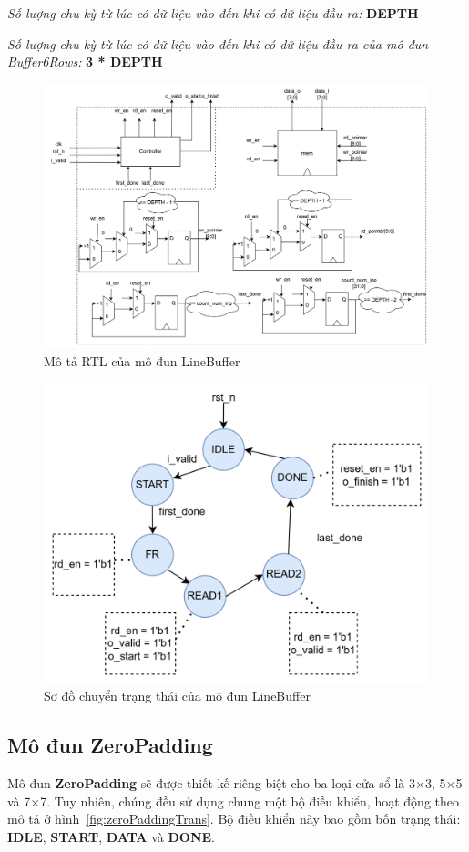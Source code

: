 \textit{Số lượng chu kỳ từ lúc có dữ liệu vào đến khi có dữ liệu đầu ra: } \textbf{DEPTH}


\textit{Số lượng chu kỳ từ lúc có dữ liệu vào đến khi có dữ liệu đầu ra của mô đun Buffer6Rows: } \textbf{3 * DEPTH}


\begin{figure}[!ht]
    \centering
    \includegraphics[width=\linewidth]{figures/lineBuffArchitecture.png}
    \caption{Mô tả RTL của mô đun LineBuffer}
    \label{fig:lineBuffArchitecture}
\end{figure}


\begin{figure}[!ht]
    \centering
    \includegraphics[width=0.8\linewidth]{figures/lineBufferTrans.png}
    \caption{Sơ đồ chuyển trạng thái của mô đun LineBuffer}
    \label{fig:lineBufferTrans}
\end{figure}


\subsection{Mô đun ZeroPadding}
Mô-đun \textbf{ZeroPadding} sẽ được thiết kế riêng biệt cho ba loại cửa sổ là 3$\times$3, 5$\times$5 và 7$\times$7. Tuy nhiên, chúng đều sử dụng chung một bộ điều khiển, hoạt động theo mô tả ở hình~\ref{fig:zeroPaddingTrans}. Bộ điều khiển này bao gồm bốn trạng thái: \textbf{IDLE}, \textbf{START}, \textbf{DATA} và \textbf{DONE}.

